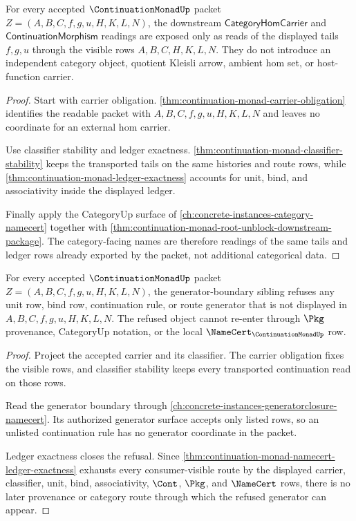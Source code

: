 \begin{theorem}
\label{thm:continuation-monad-category-hom-row-exposure}
For every accepted $\ContinuationMonadUp$ packet $Z=(A,B,C,f,g,u,H,K,L,N)$, the downstream $\mathsf{CategoryHomCarrier}$ and $\mathsf{ContinuationMorphism}$ readings are exposed only as reads of the displayed tails $f,g,u$ through the visible rows $A,B,C,H,K,L,N$. They do not introduce an independent category object, quotient Kleisli arrow, ambient hom set, or host-function carrier.
\end{theorem}
\begin{proof}
Start with carrier obligation. \autoref{thm:continuation-monad-carrier-obligation} identifies the readable packet with $A,B,C,f,g,u,H,K,L,N$ and leaves no coordinate for an external hom carrier.

Use classifier stability and ledger exactness. \autoref{thm:continuation-monad-classifier-stability} keeps the transported tails on the same histories and route rows, while \autoref{thm:continuation-monad-ledger-exactness} accounts for unit, bind, and associativity inside the displayed ledger.

Finally apply the CategoryUp surface of \autoref{ch:concrete-instances-category-namecert} together with \autoref{thm:continuation-monad-root-unblock-downstream-package}. The category-facing names are therefore readings of the same tails and ledger rows already exported by the packet, not additional categorical data.
\end{proof}

\begin{theorem}
\label{thm:continuation-monad-generator-boundary-refusal}
For every accepted $\ContinuationMonadUp$ packet $Z=(A,B,C,f,g,u,H,K,L,N)$, the generator-boundary sibling refuses any unit row, bind row, continuation rule, or route generator that is not displayed in $A,B,C,f,g,u,H,K,L,N$. The refused object cannot re-enter through $\Pkg$ provenance, CategoryUp notation, or the local $\NameCert_{\ContinuationMonadUp}$ row.
\end{theorem}
\begin{proof}
Project the accepted carrier and its classifier. The carrier obligation fixes the visible rows, and classifier stability keeps every transported continuation read on those rows.

Read the generator boundary through \autoref{ch:concrete-instances-generatorclosure-namecert}. Its authorized generator surface accepts only listed rows, so an unlisted continuation rule has no generator coordinate in the packet.

Ledger exactness closes the refusal. Since \autoref{thm:continuation-monad-namecert-ledger-exactness} exhausts every consumer-visible route by the displayed carrier, classifier, unit, bind, associativity, $\Cont$, $\Pkg$, and $\NameCert$ rows, there is no later provenance or category route through which the refused generator can appear.
\end{proof}

